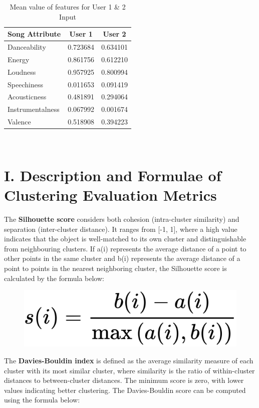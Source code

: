 \documentclass{article}
\begin{document}
\begin{table}[H]
\centering
\begin{tabular}{lcc}
\toprule
\textbf{Song Attribute} & \textbf{User 1} & \textbf{User 2} \\ \hline
Danceability            & 0.723684        & 0.634101        \\ 
Energy                  & 0.861756        & 0.612210        \\ 
Loudness                & 0.957925        & 0.800994        \\ 
Speechiness             & 0.011653        & 0.091419        \\ 
Acousticness            & 0.481891        & 0.294064        \\ 
Instrumentalness        & 0.067992        & 0.001674        \\ 
Valence                 & 0.518908        & 0.394223        \\ \hline
\end{tabular}
\\[1ex]
\caption{Mean value of features for User 1 \& 2 Input}
\label{tab:my-table2}
\end{table}


\section*{I. Description and Formulae of Clustering Evaluation Metrics}

The \textbf{Silhouette score} considers both cohesion (intra-cluster similarity) and separation (inter-cluster distance). It ranges from [-1, 1], where a high value indicates that the object is well-matched to its own cluster and distinguishable from neighbouring clusters. If a(i) represents the average distance of a point to other points in the same cluster and b(i) represents the average distance of a point to points in the nearest neighboring cluster, the Silhouette score is calculated by the formula below:
\begin{figure}[H]
    \centering
    \includegraphics[width=0.4\linewidth]{Images/silhouette.png}
\end{figure}

The \textbf{Davies-Bouldin index} is defined as the average similarity measure of each cluster with its most similar cluster, where similarity is the ratio of within-cluster distances to between-cluster distances. The minimum score is zero, with lower values indicating better clustering. The Davies-Bouldin score can be computed using the formula below:
\end{document}
